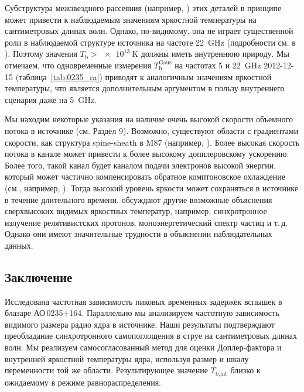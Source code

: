 Субструктура межзвездного рассеяния (например, \cite{Johnson_2016}) этих деталей в принципе может
привести к наблюдаемым значениям яркостной температуры на сантиметровых длинах волн. Однако,
по-видимому, она не играет существенной роли в наблюдаемой структуре источника на частоте
\SI{22}{\GHz} (подробности см. в \cite{Johnson_2015}). Поэтому значения $T_\text{b} >
\SI{e13}{\kelvin}$ должны иметь внутреннюю природу. Мы отмечаем, что одновременные измерения
$T_\text{b}^\text{Gaus}$ на частотах 5 и \SI{22}{\GHz} 2012-12-15 (таблица~\ref{tab:0235_ra})
приводят к аналогичным значениям яркостной температуры, что является дополнительным аргументом в
пользу внутреннего сценария даже на \SI{5}{\GHz}.

Мы находим некоторые указания на наличие очень высокой скорости объемного потока в источнике (см.
Раздел 9). Возможно, существуют области с градиентами скорости, как структура spine-sheath в M87
(например, \cite{Mertens_2016}). Более высокая скорость потока в канале может привести к более
высокому допплеровскому ускорению. Более того, такой канал будет каналом подачи электронов высокой
энергии, который может частично компенсировать обратное комптоновское охлаждение (см., например,
\cite{Readhead_1994}). Тогда высокий уровень яркости может сохраняться в источнике в течение
длительного времени. \cite{Kovalev_2016} обсуждают другие возможные объяснения сверхвысоких видимых
яркостных температур, например, синхротронное излучение релятивистских протонов, моноэнергетический
спектр частиц и т.\,д. Однако они имеют значительные трудности в объяснении наблюдательных данных.

\subsection{Заключение}

Исследована частотная зависимость пиковых временных задержек вспышек в блазаре АО\,0235+164.
Параллельно мы анализируем частотную зависимость видимого размера радио ядра в источнике. Наши
результаты подтверждают преобладание синхротронного самопоглощения в струе на сантиметровых длинах
волн. Мы реализуем самосогласованный метод для оценки Доплер-фактора и внутренней яркостной
температуры ядра, используя размер и шкалу переменности той же области. Результирующее значение
$T_\text{b,int}$ близко к ожидаемому в режиме равнораспределения.

